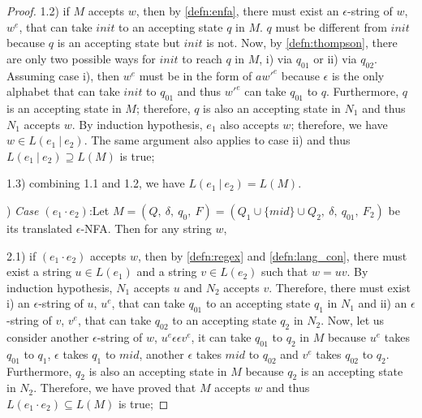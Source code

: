 \begin{proof}
\par 1.2) if \(M\) accepts \(w\), then by \autoref{defn:enfa}, there must exist an
\(\epsilon\)-string of \(w\), \(w^e\), that can take \(init\) to an
accepting state \(q\) in \(M\). \(q\) must be different from \(init\) because
\(q\) is an accepting state but \(init\) is not. Now, by
\autoref{defn:thompson}, there are only two possible ways for \(init\) to reach \(q\) in \(M\), i)
via \(q_{01}\) or ii) via \(q_{02}\). Assuming case i), then \(w^e\)
must be in the form of \(aw'^e\) because \(\epsilon\) is the only alphabet that can take
\(init\) to \(q_{01}\) and thus \(w'^e\) can take \(q_{01}\) to \(q\). Furthermore, \(q\) is an
accepting state in \(M\); therefore, \(q\) is also an accepting
state in \(N_1\) and thus \(N_1\) accepts \(w\). By induction hypothesis, \(e_1\) also accepts \(w\);
therefore, we have \(w \in L(e_1\ |\ e_2)\). The same argument also
applies to case ii) and thus \(L(e_1\ |\ e_2) \supseteq L(M)\) is true; 

\par 1.3) combining 1.1 and 1.2, we have \(L(e_1\ |\ e_2) = L(M)\). 

\par {}) \textit{Case \((e_1 \cdot e_2)\)}:\quad Let \(M = (Q,\
\delta,\ q_0,\ F) = (Q_1 \cup \{mid\} \cup Q_2,\ \delta,\ q_{01},\
F_2)\) be its translated \(\epsilon\)-NFA. Then for any string
\(w\), 

\par 2.1) if \((e_1 \cdot e_2)\) accepts \(w\), then by
\autoref{defn:regex} and \autoref{defn:lang_con}, there must exist a string \(u \in L(e_1)\) and a string \(v \in L(e_2)\) such that \(w
= uv\). By induction hypothesis, \(N_1\) accepts \(u\) and \(N_2\)
accepts \(v\). Therefore, there must exist i) an \(\epsilon\)-string
of \(u\), \(u^e\), that can take \(q_{01}\) to an accepting state \(q_1\) in
\(N_1\) and ii) an \(\epsilon\)-string of \(v\), \(v^e\), that can take
\(q_{02}\) to an accepting state \(q_2\) in \(N_2\). Now, let us
consider another \(\epsilon\)-string of \(w\), \(u^e\epsilon \epsilon
v^e\), it can take \(q_{01}\) to \(q_2\) in \(M\) because \(u^e\) takes
\(q_{01}\) to \(q_1\), \(\epsilon\) takes \(q_1\) to \(mid\), another
\(\epsilon\) takes \(mid\) to \(q_{02}\) and \(v^e\) takes \(q_{02}\)
to \(q_2\). Furthermore, \(q_2\)
is also an accepting state in \(M\) because \(q_2\) is an accepting
state in \(N_2\). Therefore, we have proved that \(M\) accepts \(w\)
and thus \(L(e_1 \cdot e_2) \subseteq L(M)\) is true; 


\end{proof}
